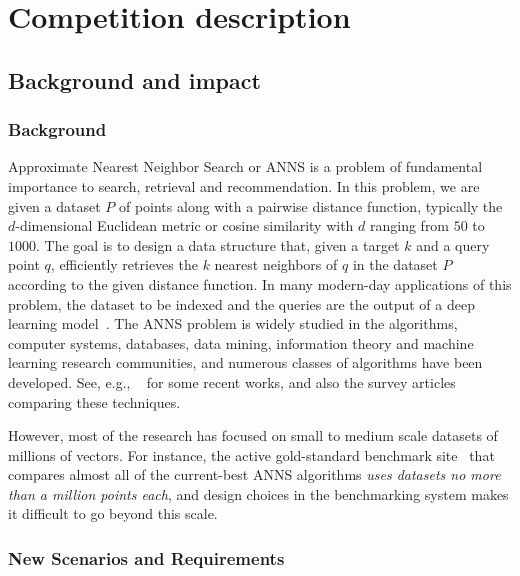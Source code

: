 
\section{Competition description}

\subsection{Background and impact}

\subsubsection{Background} 
Approximate Nearest Neighbor Search or ANNS is a problem of
fundamental importance to search, retrieval and recommendation.  In
this problem, we are given a dataset $P$ of points along with a
pairwise distance function, typically the $d$-dimensional Euclidean
metric or cosine similarity with $d$ ranging from $50$ to $1000$. The
goal is to design a data structure that, given a target $k$ and a
query point $q$, efficiently retrieves the $k$ nearest neighbors of 
$q$ in the dataset $P$ according to the given distance function. In
many modern-day applications of this problem, the dataset to be
indexed and the queries are the output of a deep learning
model~\citep{deep1b-link,BERT}.  The ANNS problem is widely studied in
the algorithms, computer systems, databases, data mining, information
theory and machine learning research communities, and numerous classes
of algorithms have been developed. See, e.g.,
~\citep{CoverTree,babenko2014additive,Faiss17,Weber98,ECCV18,HNSW16,PQ11,Arya93,Indyk98,onng,scann,puffinn}
for some recent works, and also the survey
articles~\citep{samet2006foundations, LSHSurvey08, LearningToHash18,
  GraphANNSSurvey21} comparing these techniques.

However, most of the research has focused on small to medium scale
datasets of millions of vectors. For instance, the active
gold-standard benchmark site~\citep{Benchmark} that compares almost all
of the current-best ANNS algorithms \emph{uses datasets no more than a
  million points each}, and design choices in the benchmarking system
makes it difficult to go beyond this scale.

\subsubsection{New Scenarios and Requirements}  \label{sec:scenarios}



